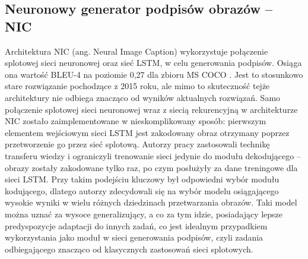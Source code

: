 \subsection{Neuronowy generator podpisów obrazów -- NIC}
Architektura NIC \cite{nic} (ang. Neural Image Caption) wykorzystuje połączenie splotowej sieci neuronowej \cite{ioffe2015batch} oraz sieć LSTM, w celu generowania podpisów. Osiąga ona wartość BLEU-4 na poziomie 0,27 dla zbioru MS COCO \cite{mscoco}. Jest to stosunkowo stare rozwiązanie pochodzące z 2015 roku, ale mimo to skuteczność tejże architektury nie odbiega znacząco od wyników aktualnych rozwiązań. Samo połączenie splotowej sieci neuronowej wraz z siecią rekurencyjną w architekturze NIC zostało zaimplementowane w nieskomplikowany sposób: pierwszym elementem wejściowym sieci LSTM jest zakodowany obraz otrzymany poprzez przetworzenie go przez sieć splotową. Autorzy pracy zastosowali technikę transferu wiedzy i ograniczyli trenowanie sieci jedynie do modułu dekodującego -- obrazy zostały zakodowane tylko raz, po czym posłużyły za dane treningowe dla sieci LSTM. Przy takim podejściu kluczowy był odpowiedni wybór modułu kodującego, dlatego autorzy zdecydowali się na wybór modelu osiągającego wysokie wyniki w wielu różnych dziedzinach przetwarzania obrazów. Taki model można uznać za wysoce generalizujący, a co za tym idzie, posiadający lepsze predyspozycje adaptacji do innych zadań, co jest idealnym przypadkiem wykorzystania jako moduł w sieci generowania podpisów, czyli zadania odbiegającego znacząco od klasycznych zastosowań sieci splotowych.

